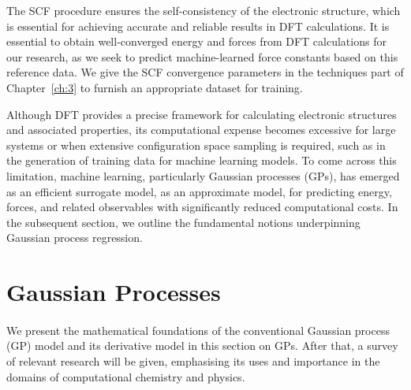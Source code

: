 The SCF procedure ensures the self-consistency of the electronic structure, which is essential for achieving accurate and reliable results in DFT calculations. It is essential to obtain well-converged energy and forces from DFT calculations for our research, as we seek to predict machine-learned force constants based on this reference data.  We give the SCF convergence parameters in the techniques part of Chapter~\ref{ch:3} to furnish an appropriate dataset for training.

Although DFT provides a precise framework for calculating electronic structures and associated properties, its computational expense becomes excessive for large systems or when extensive configuration space sampling is required, such as in the generation of training data for machine learning models.  To come across this limitation, machine learning, particularly Gaussian processes (GPs), has emerged as an efficient surrogate model, as an approximate model, for predicting energy, forces, and related observables with significantly reduced computational costs.  In the subsequent section, we outline the fundamental notions underpinning Gaussian process regression.

\section{Gaussian Processes} \label{sec:2.3}
\paragraph{}
We present the mathematical foundations of the conventional Gaussian process (GP) model and its derivative model in this section on GPs.
After that, a survey of relevant research will be given, emphasising its uses and importance in the domains of computational chemistry and physics.


